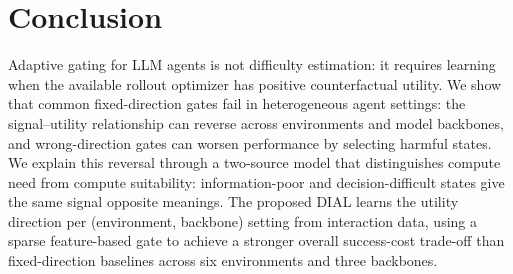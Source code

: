 
\section{Conclusion}

Adaptive gating for LLM agents is not difficulty estimation: it requires learning when the available rollout optimizer has positive counterfactual utility. We show that common fixed-direction gates fail in heterogeneous agent settings: the signal--utility relationship can reverse across environments and model backbones, and wrong-direction gates can worsen performance by selecting harmful states. We explain this reversal through a two-source model that distinguishes compute need from compute suitability: information-poor and decision-difficult states give the same signal opposite meanings. The proposed DIAL learns the utility direction per (environment, backbone) setting from interaction data, using a sparse feature-based gate to achieve a stronger overall success-cost trade-off than fixed-direction baselines across six environments and three backbones.
